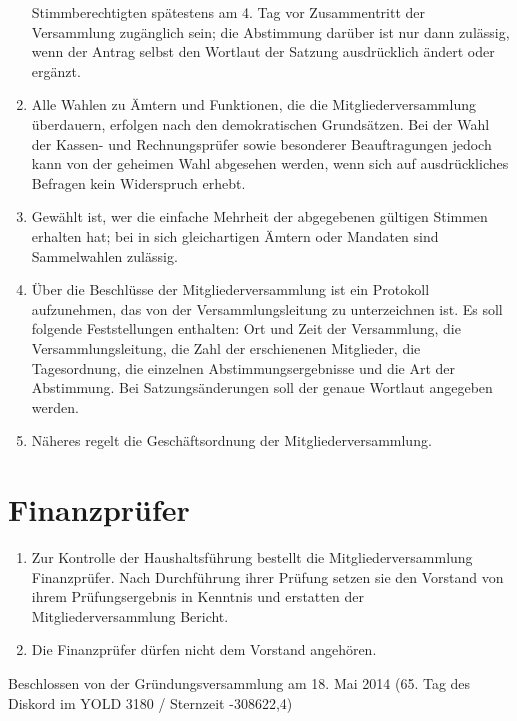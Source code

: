 \begin{enumerate}
		Stimmberechtigten spätestens am 4. Tag vor Zusammentritt der Versammlung zugänglich sein; die Abstimmung darüber ist nur dann zulässig, wenn der Antrag selbst den Wortlaut der Satzung ausdrücklich ändert oder ergänzt.
	\item Alle Wahlen zu Ämtern und Funktionen, die die Mitgliederversammlung überdauern, erfolgen nach den demokratischen Grundsätzen. Bei der Wahl der Kassen- und Rechnungsprüfer sowie besonderer Beauftragungen jedoch kann von der geheimen Wahl abgesehen werden, wenn sich auf ausdrückliches Befragen kein Widerspruch erhebt.
	\item Gewählt ist, wer die einfache Mehrheit der abgegebenen gültigen Stimmen erhalten hat; bei in sich gleichartigen Ämtern oder Mandaten sind Sammelwahlen zulässig.
	\item Über die Beschlüsse der Mitgliederversammlung ist ein Protokoll aufzunehmen, das von der Versammlungsleitung zu unterzeichnen ist. Es soll folgende Feststellungen enthalten: Ort und Zeit der Versammlung, die Versammlungsleitung, die Zahl der erschienenen Mitglieder, die Tagesordnung, die einzelnen Abstimmungsergebnisse und die Art der Abstimmung. Bei Satzungsänderungen soll der genaue Wortlaut angegeben werden.
	\item Näheres regelt die Geschäftsordnung der Mitgliederversammlung.

\end{enumerate}

\chapter{Finanzprüfer}

\begin{enumerate}
	\item Zur Kontrolle der Haushaltsführung bestellt die Mitgliederversammlung Finanzprüfer. Nach Durchführung ihrer Prüfung setzen sie den Vorstand von ihrem Prüfungsergebnis in Kenntnis und erstatten der Mitgliederversammlung Bericht.
	\item Die Finanzprüfer dürfen nicht dem Vorstand angehören.
\end{enumerate}

\vfill

Beschlossen von der Gründungsversammlung am 18. Mai 2014 (65. Tag des Diskord im YOLD 3180 / Sternzeit -308622,4)

